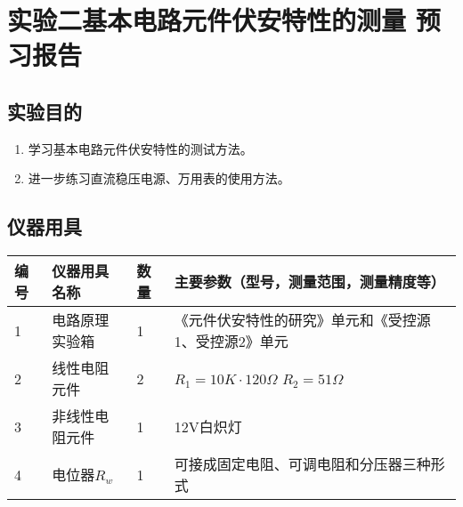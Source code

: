 \documentclass[dvipsnames, svgnames,a4paper,11pt]{article}
\begin{document}
	
	
	\clearpage
	\tableofcontents
	\clearpage
	
	
	
	
	\setcounter{section}{0}
	\section{实验二\quad 基本电路元件伏安特性的测量 \quad\heiti 预习报告}
	
	\subsection{实验目的}
	\begin{enumerate}
		\item 学习基本电路元件伏安特性的测试方法。
		
		\item 进一步练习直流稳压电源、万用表的使用方法。
		
	\end{enumerate}
	
	\subsection{仪器用具}
	\begin{table}[htbp]
		\centering
		\renewcommand\arraystretch{1.6}
		\begin{tabular}{p{}|p{}|p{}|p{}}
			\hline
			编号& 仪器用具名称 & 数量 &  主要参数（型号，测量范围，测量精度等） \\
			\hline
			1 & 电路原理实验箱 & 1 & {\footnotesize《元件伏安特性的研究》单元和《受控源1、受控源2》单元}  \\
			\hline
			2 & 线性电阻元件   & 2 & $R_1=10K·120\Omega$ \quad $R_2=51\Omega$ \\
			\hline
			3 & 非线性电阻元件 & 1 & 12V白炽灯 \\
			\hline
			4 & 电位器$R_w$ & 1 & 可接成固定电阻、可调电阻和分压器三种形式 \\
			\hline
		\end{tabular}
	\end{table}
	
\end{document}
